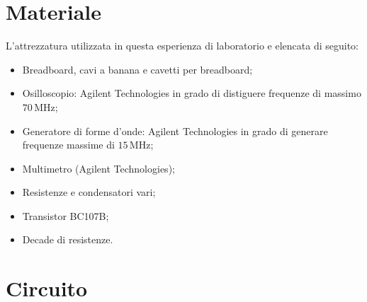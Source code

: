 \section*{Materiale}

L'attrezzatura utilizzata in questa esperienza di laboratorio e elencata di seguito:

\begin{itemize}
    \setlength{\itemsep}{1pt}
    \item{Breadboard, cavi a banana e cavetti per breadboard;}
    \item{Osilloscopio: Agilent Technologies in grado di distiguere frequenze di massimo $70\,\si{\mega\hertz}$;}
    \item{Generatore di forme d'onde: Agilent Technologies in grado di generare frequenze massime di $15\,\si{\mega\hertz}$;}
    \item{Multimetro (Agilent Technologies);}
    \item{Resistenze e condensatori vari;}
    \item{Transistor BC107B;}
    \item{Decade di resistenze.}
\end{itemize}

\section*{Circuito}